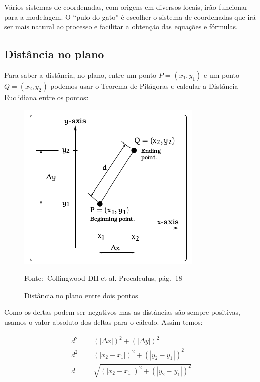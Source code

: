 \documentclass[pdftex, brazil, 12pt, twoside]{article}
\begin{document}
Vários sistemas de coordenadas, com origens em diversos locais, irão funcionar
para a modelagem. O ``pulo do gato'' é escolher o sistema de coordenadas que
irá ser mais natural ao processo e facilitar a obtenção das equações e fórmulas.

\subsection{Distância no plano}
\label{sistema-coordenadas-distancia-plano}

Para saber a distância, no plano, entre um ponto $P = (x_1, y_1)$ e um ponto
$Q = (x_2, y_2)$ podemos usar o Teorema de Pitágoras e calcular a Distância Euclidiana
entre os pontos:

\begin{figure}[ht]
  \begin{center}
    \caption{Distância no plano entre dois pontos}
    \label{fig:distancia-plano}
    \includegraphics[scale=0.9]{imagens/distancia.png}
    
    \footnotesize{Fonte:~Collingwood DH et al. Precalculus, pág.\ 18}
  \end{center}
\end{figure}

Como os deltas podem ser negativos mas as distâncias são sempre positivas, usamos
o valor absoluto dos deltas para o cálculo. Assim temos:

\begin{equation}
  \begin{split}
    d^2 & = (|\Delta x|)^2 + (|\Delta y|)^2\\
    d^2 & = (|x_2 - x_1|)^2 + (|y_2 - y_1|)^2\\
      d & = \sqrt{(|x_2 - x_1|)^2 + (|y_2 - y_1|)^2}
  \end{split}
\end{equation}
\end{document}

